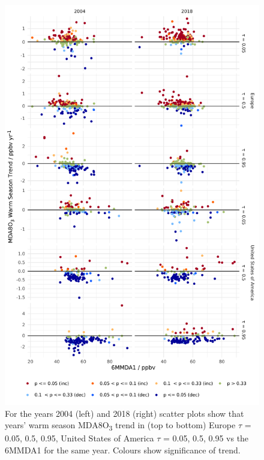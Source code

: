 \documentclass{article}
\begin{document}
\begin{figure}[p]
\centering
\includegraphics[height=0.75\textheight]{figures/si_figures/fS23_mda8_warm_sig_mda8_6mmda1.pdf}
\caption{For the years 2004 (left) and 2018 (right) scatter plots show that years' warm season MDA8O\textsubscript{3} trend in (top to bottom) Europe $\tau$ = 0.05, 0.5, 0.95, United States of America $\tau$ = 0.05, 0.5, 0.95 vs the 6MMDA1 for the same year. Colours show significance of trend.}
\label{si_fig:mda8_warm_sig_mda8_6mmda1}
\end{figure}
\clearpage
\end{document}
